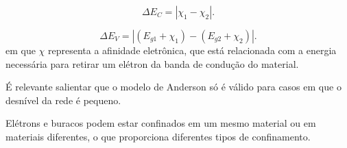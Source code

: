 	\begin{equation}
		\label{bandas_3}
		\Delta E_{C} = \left|  \chi_{1} - \chi_{2} \right|.
	\end{equation}

	\begin{equation}
		\label{bandas_4}
		\Delta E_{V} = \left| \left(E_{g1} + \chi_{1}\right) - \left(E_{g2} + \chi_{2}\right) \right|.
	\end{equation}
	em que $\chi$ representa a afinidade eletrônica, que está relacionada com a energia necessária para retirar um elétron da banda de condução do material. 

	\par É relevante salientar que o modelo de Anderson só é válido para casos em que o desnível da rede é pequeno. 

	\par Elétrons e buracos podem estar confinados em um mesmo material ou em materiais diferentes, o que proporciona diferentes tipos de confinamento\cite{bulk2}.


